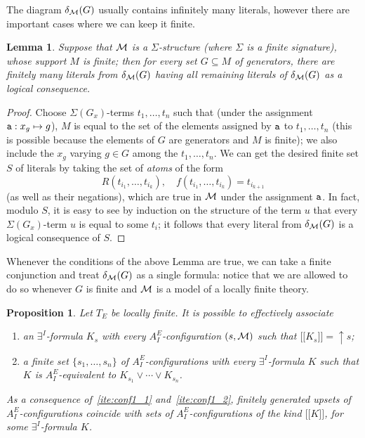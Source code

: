 \documentclass{LMCS}
\newcommand{\cM}{\ensuremath \mathcal M}
\newcommand{\mywidehat}[1]{\ensuremath{\lbrack\!\lbrack #1 \rbrack\!\rbrack}}
\theoremstyle{plain}\newtheorem{assumption}[thm]{Assumption}
\theoremstyle{plain}\newtheorem{proposition}[thm]{Proposition}
\theoremstyle{plain}\newtheorem{property}[thm]{Property}
\theoremstyle{plain}\newtheorem{example}[thm]{Example}
\theoremstyle{plain}\newtheorem{claim}[thm]{Claim}
\theoremstyle{plain}\newtheorem{lemma}[thm]{Lemma}
\begin{document}
The diagram $\delta_{\cM}(G)$ usually contains infinitely many
literals, however there are important cases where we can keep it
finite.
\begin{lemma}
  Suppose that $\cM$ is a $\Sigma$-structure (where $\Sigma$ is a
  finite signature), whose support $M$ is finite; then for every set
  $G\subseteq M$ of generators, there are finitely many literals from
  $\delta_{\cM}(G)$ having all remaining literals of $\delta_{\cM}(G)$
  as a logical consequence.
\end{lemma}
\begin{proof} Choose $\Sigma(G_x)$-terms $t_1, \dots, t_n$ such that (under the
  assignment ${\tt a}:x_g\mapsto g$), $M$ is equal to the set of the
  elements assigned by ${\tt a}$ to $t_1, \dots, t_n$ (this is
  possible because the elements of $G$ are generators and $M$ is
  finite); we also include the $x_g$ varying $g\in G$ among the $t_1,
  \dots, t_n$. We can get the desired finite set $S$ of literals by
  taking the set of \emph{atoms} of the form
  \begin{equation*}
    R(t_{i_1}, \dots, t_{i_k}), \quad f(t_{i_1}, \dots, t_{i_k})= t_{i_{k+1}}
  \end{equation*}
  (as well as their negations), which are true in $\cM$ under the
  assignment ${\tt a}$. In fact, modulo $S$, it is easy to see by
  induction on
the structure of the term $u$ that every $\Sigma(G_x)$-term $u$ is
  equal to some $t_i$; it follows that every literal from
  $\delta_{\cM}(G)$ is a logical consequence of $S$.
\end{proof}
Whenever the conditions of the above Lemma are true, we can take a
finite conjunction and treat $\delta_{\cM}(G)$ as a single formula:
notice that we are allowed to do so whenever $G$ is finite and $\cM$
is a model of a locally finite theory.
\begin{proposition}\label{prop:conf1}
Let $T_E$ be locally finite.  It is possible to effectively associate
  \begin{enumerate}[{\rm (i)}]
  \item\label{ite:conf1_1} an $\exists^I$-formula $K_{s}$ with every
    $A^E_I$-configuration $(s, \cM)$ such that $\mywidehat{K_{s}} =
    \uparrow\! s$;
  \item\label{ite:conf1_2} a finite set $\{s_1, \dots, s_n\}$ of
    $A^E_I$-configurations with every $\exists^I$-formula $K$ such
    that $K$ is $A^E_I$-equivalent to $K_{s_1}\vee \cdots\vee
    K_{s_n}$.
  \end{enumerate}
  As a consequence of~\eqref{ite:conf1_1} and~\eqref{ite:conf1_2},
  finitely generated upsets of $A^E_I$-configurations coincide with
  sets of $A^E_I$-con\-fi\-gu\-ra\-tions of the kind $\mywidehat{K}$,
  for some $\exists^I$-formula $K$.
\end{proposition}
\end{document}
